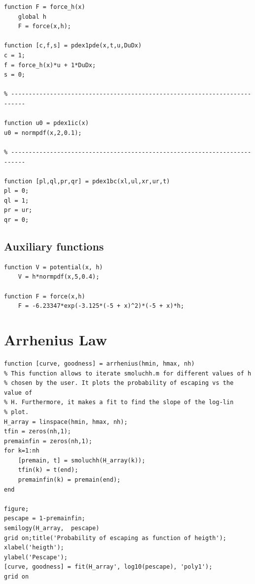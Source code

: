 \documentclass[11pt,letterpaper]{article}
\begin{document}
\begin{lstlisting}
function F = force_h(x)
    global h
    F = force(x,h);

function [c,f,s] = pdex1pde(x,t,u,DuDx)
c = 1;
f = force_h(x)*u + 1*DuDx;
s = 0;

% --------------------------------------------------------------------------

function u0 = pdex1ic(x)
u0 = normpdf(x,2,0.1);

% --------------------------------------------------------------------------

function [pl,ql,pr,qr] = pdex1bc(xl,ul,xr,ur,t)
pl = 0;
ql = 1;
pr = ur;
qr = 0;

\end{lstlisting}

\subsection{Auxiliary functions}
\begin{lstlisting}
function V = potential(x, h)
    V = h*normpdf(x,5,0.4);
    
function F = force(x,h)
    F = -6.23347*exp(-3.125*(-5 + x)^2)*(-5 + x)*h;
\end{lstlisting}

\section{Arrhenius Law}
\begin{lstlisting}
function [curve, goodness] = arrhenius(hmin, hmax, nh)
% This function allows to iterate smoluchh.m for different values of h
% chosen by the user. It plots the probability of escaping vs the value of
% H. Furthermore, it makes a fit to find the slope of the log-lin
% plot.
H_array = linspace(hmin, hmax, nh);
tfin = zeros(nh,1);
premainfin = zeros(nh,1);
for k=1:nh
    [premain, t] = smoluchh(H_array(k));
    tfin(k) = t(end);
    premainfin(k) = premain(end);
end

figure;
pescape = 1-premainfin;
semilogy(H_array,  pescape)
grid on;title('Probability of escaping as function of heigth');
xlabel('heigth');
ylabel('Pescape');
[curve, goodness] = fit(H_array', log10(pescape), 'poly1');
grid on
\end{lstlisting}
\end{document}
